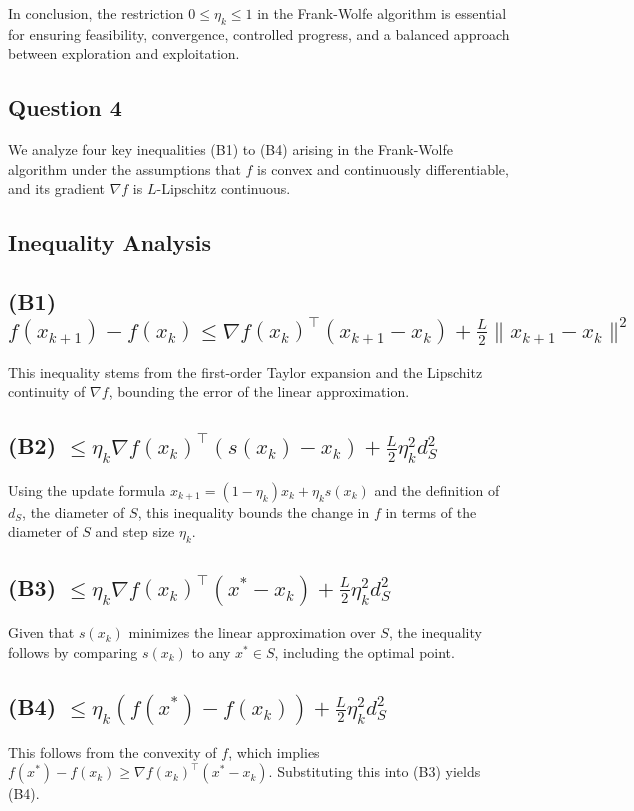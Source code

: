 \documentclass[12p]{article}
\begin{document}
In conclusion, the restriction \( 0 \leq \eta_k \leq 1 \) in the Frank-Wolfe algorithm is essential for ensuring feasibility, convergence, controlled progress, and a balanced approach between exploration and exploitation.


\subsection*{Question 4} 

We analyze four key inequalities (B1) to (B4) arising in the Frank-Wolfe algorithm under the assumptions that \( f \) is convex and continuously differentiable, and its gradient \( \nabla f \) is \( L \)-Lipschitz continuous.

\subsection*{Inequality Analysis}

\subsection*{(B1) \( f(x_{k+1}) - f(x_k) \leq \nabla f(x_k)^\top (x_{k+1} - x_k) + \frac{L}{2} \|x_{k+1} - x_k\|^2 \)}
This inequality stems from the first-order Taylor expansion and the Lipschitz continuity of \( \nabla f \), bounding the error of the linear approximation.

\subsection*{(B2) \( \leq \eta_k \nabla f(x_k)^\top (s(x_k) - x_k) + \frac{L}{2} \eta_k^2 d_S^2 \)}
Using the update formula \( x_{k+1} = (1 - \eta_k)x_k + \eta_k s(x_k) \) and the definition of \( d_S \), the diameter of \( S \), this inequality bounds the change in \( f \) in terms of the diameter of \( S \) and step size \( \eta_k \).

\subsection*{(B3) \( \leq \eta_k \nabla f(x_k)^\top (x^* - x_k) + \frac{L}{2} \eta_k^2 d_S^2 \)}
Given that \( s(x_k) \) minimizes the linear approximation over \( S \), the inequality follows by comparing \( s(x_k) \) to any \( x^* \in S \), including the optimal point.

\subsection*{(B4) \( \leq \eta_k (f(x^*) - f(x_k)) + \frac{L}{2} \eta_k^2 d_S^2 \)}
This follows from the convexity of \( f \), which implies \( f(x^*) - f(x_k) \geq \nabla f(x_k)^\top (x^* - x_k) \). Substituting this into (B3) yields (B4).
\end{document}
